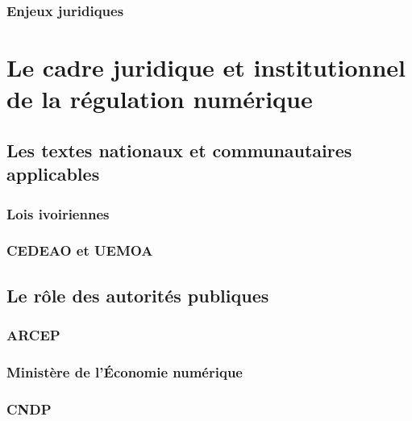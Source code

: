 
\subsection{Enjeux juridiques}


\chapter{Le cadre juridique et institutionnel de la régulation numérique}

\section{Les textes nationaux et communautaires applicables}

\subsection{Lois ivoiriennes}


\subsection{CEDEAO et UEMOA}


\section{Le rôle des autorités publiques}

\subsection{ARCEP}


\subsection{Ministère de l’Économie numérique}


\subsection{CNDP}

